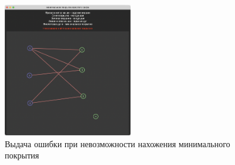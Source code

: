 \documentclass[12pt]{article}
\begin{document}
\begin{figure}[H]
    \centering
    \includegraphics[width=0.5\textwidth]{screenshot1.png}
    \caption{Выдача ошибки при невозможности
        нахожения минимального покрытия}
    \label{fig:failure_example}
\end{figure}
\end{document}
